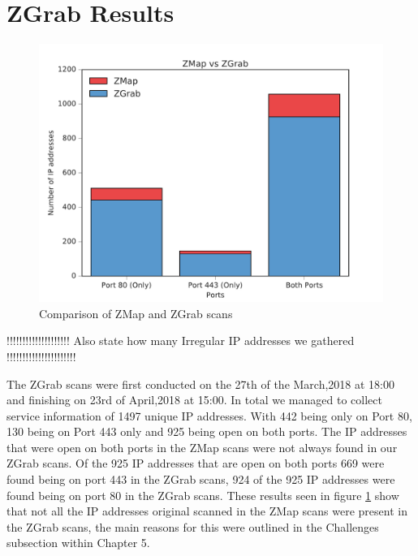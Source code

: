 \documentclass[a4wide,leqno,12pt]{report}
\begin{document}
\section{ZGrab Results}
\begin{figure}[H]
\centering
\includegraphics[scale=.5]{pdf_images/ZMapvsZGrab}
\caption{Comparison of ZMap and ZGrab scans}
\label{fig:zmap_vs_zgrab}
\end{figure}

!!!!!!!!!!!!!!!!!!!! Also state how many Irregular IP addresses we gathered !!!!!!!!!!!!!!!!!!!!!!


The ZGrab scans were first conducted on the 27th of the March,2018 at 18:00 and finishing on 23rd of April,2018 at 15:00. In total we managed to collect service information of 1497 unique IP addresses. With 442 being only on Port 80, 130 being on Port 443 only and 925 being open on both ports. The IP addresses that were open on both ports in the ZMap scans were not always found in our ZGrab scans. Of the 925 IP addresses that are open on both ports 669 were found being on port 443 in the ZGrab scans, 924 of the 925 IP addresses were found being on port 80 in the ZGrab scans. These results seen in figure \ref{fig:zmap_vs_zgrab} show that not all the IP addresses original scanned in the ZMap scans were present in the ZGrab scans, the main reasons for this were outlined in the Challenges subsection within Chapter 5.
\end{document}
